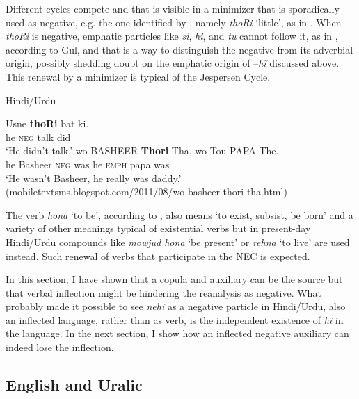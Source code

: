 \documentclass[output=paper,draft,draftmode,colorlinks,citecolor=brown]{langscibook}
\begin{document}
Different cycles compete and that is visible in a minimizer that is
sporadically used as negative, e.g. the one identified by \citet{Gul2009},
namely \textit{thoRi} `little', as in . When \textit{thoRi}
is negative, emphatic particles like \textit{si}, \textit{hi}, and
\textit{tu} cannot follow it, as in , according to Gul, and
that is a way to distinguish the negative from its adverbial origin,
possibly shedding doubt on the emphatic origin of –\textit{hĩ} discussed
above. This renewal by a minimizer is typical of the Jespersen Cycle.
\begin{exe}\ex Hindi\slash Urdu \label{ex:other-hindi-talk-Basheer}\begin{xlist}
    \ex  \label{ex:other-hindi-talk}
    \gll Usne \textbf{thoRi} bat ki. \\
    he  \textsc{neg}  talk  did \\
    \glt `He didn't talk.’ \citep{Gul2009}
    \ex \label{ex:other-hindi-Basheer}
    \gll wo BASHEER \textbf{Thori} Tha, wo Tou PAPA The.  \\
    he  Basheer  \textsc{neg}  was  he  \textsc{emph}  papa  was\\
    \glt `He wasn't Basheer, he really was daddy.’ 
(mobiletextsms.blogspot.com/2011/08/wo-basheer-thori-tha.html)
    \end{xlist}\end{exe}
%
The verb \textit{hona} `to be', according to \citet{Platts1884}, also means
`to exist, subsist, be born' and a variety of other meanings typical of
existential verbs but in present-day Hindi\slash Urdu compounds like
\textit{mowjud hona} `be present' or \textit{rehna} `to live' are used
instead. Such renewal of verbs that participate in the NEC is expected.

In this section, I have shown that a copula and auxiliary can be the source
but that verbal inflection might be hindering the reanalysis as negative.
What probably made it possible to see \textit{nehĩ} as a negative
particle in Hindi\slash Urdu, also an inflected language, rather than as
verb, is the independent existence of \textit{hĩ} in the language. In the
next section, I show how an inflected negative auxiliary can indeed lose
the inflection.

\subsection{English and Uralic}\label{sec:oth-2.2}
\end{document}
